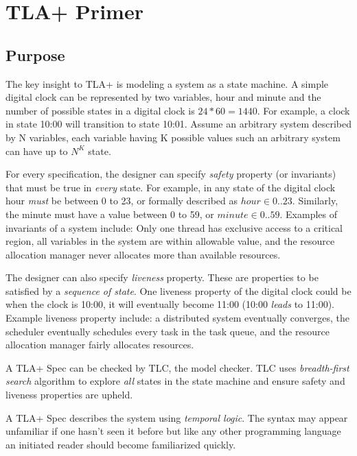 \chapter{TLA+ Primer}

\section{Purpose}

The key insight to TLA+ is modeling a system as a state machine. A simple
digital clock can be represented by two variables, hour and minute and the
number of possible states in a digital clock is $24 * 60 = 1440$. For example, a
clock in state 10:00 will transition to state 10:01. Assume an arbitrary system
described by N variables, each variable having K possible values such an
arbitrary system can have up to $N^K$ state.\newline

For every specification, the designer can specify \textit{safety} property (or
invariants) that must be true in \textit{every} state. For example, in any
state of the digital clock hour \textit{must} be between 0 to 23, or formally
described as $hour \in 0..23$. Similarly, the minute must have a value between 0 to
59, or $minute \in 0..59$. Examples of invariants of a system include: Only one
thread has exclusive access to a critical region, all variables in the system
are within allowable value, and the resource allocation manager never allocates more
than available resources.\newline

The designer can also specify \textit{liveness} property. These are properties to be
satisfied by a \textit{sequence of state}. One liveness property of the digital
clock could be when the clock is 10:00, it will eventually become 11:00 (10:00
\textit{leads} to 11:00). Example liveness property include: a distributed
system eventually converges, the scheduler eventually schedules every task in
the task queue, and the resource allocation manager fairly allocates resources.
\newline

A TLA+ Spec can be checked by TLC, the model checker. TLC uses
\textit{breadth-first search} algorithm to explore \textit{all} states in the
state machine and ensure safety and liveness properties are upheld.\newline

A TLA+ Spec describes the system using \textit{temporal logic}. The syntax may 
appear unfamiliar if one hasn't seen it before but like any other programming 
language an initiated reader should become familiarized quickly.

